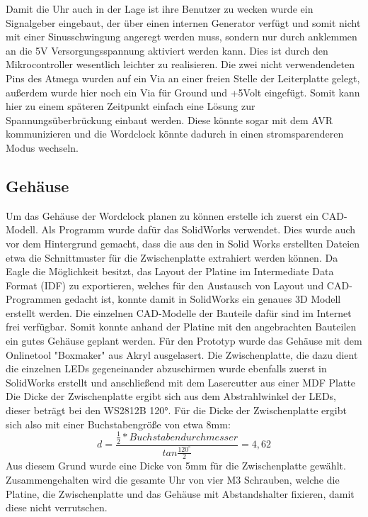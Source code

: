 \documentclass[12pt,journal,compsoc]{IEEEtran}
\begin{document}
Damit die Uhr auch in der Lage ist ihre Benutzer zu wecken wurde ein Signalgeber eingebaut, der über einen internen Generator verfügt und somit nicht mit einer Sinusschwingung angeregt werden muss, sondern nur durch anklemmen an die 5V Versorgungsspannung aktiviert werden kann. Dies ist durch den Mikrocontroller wesentlich leichter zu realisieren.
Die zwei nicht  verwendendeten Pins des Atmega wurden auf ein Via an einer freien Stelle der Leiterplatte gelegt, außerdem wurde hier noch ein Via für Ground und +5Volt eingefügt. Somit kann hier zu einem späteren Zeitpunkt einfach eine Lösung zur Spannungsüberbrückung einbaut werden. Diese könnte sogar mit dem AVR kommunizieren und die Wordclock könnte dadurch in einen stromsparenderen Modus wechseln.  

\subsection{Gehäuse}
Um das Gehäuse der Wordclock planen zu können erstelle ich zuerst ein CAD-Modell. Als Programm wurde dafür das SolidWorks verwendet. Dies wurde auch vor dem Hintergrund gemacht, dass die  aus den in Solid Works erstellten Dateien etwa die Schnittmuster für die Zwischenplatte extrahiert werden können. Da Eagle die Möglichkeit besitzt, das Layout der Platine im Intermediate Data Format  (IDF) zu exportieren, welches für den Austausch von Layout und CAD-Programmen gedacht ist, konnte damit in SolidWorks ein genaues 3D Modell erstellt werden. Die einzelnen CAD-Modelle der Bauteile dafür sind im Internet frei verfügbar. Somit konnte anhand der Platine mit den angebrachten Bauteilen ein gutes Gehäuse geplant werden. Für den Prototyp wurde das Gehäuse mit dem Onlinetool "Boxmaker" aus Akryl ausgelasert. Die Zwischenplatte, die dazu dient die einzelnen LEDs gegeneinander abzuschirmen wurde ebenfalls zuerst in SolidWorks erstellt und anschließend mit dem Lasercutter aus einer MDF Platte 
Die Dicke der Zwischenplatte ergibt sich aus dem Abstrahlwinkel der LEDs, dieser beträgt bei den WS2812B 120°. Für die Dicke der Zwischenplatte ergibt sich also mit einer Buchstabengröße von etwa 8mm: 
\begin{equation}
d = \frac{\frac{1}{2} * Buchstabendurchmesser}{tan\frac{120^\circ }{2}}= 4,62
\end{equation}
Aus diesem Grund wurde eine Dicke von 5mm für die Zwischenplatte gewählt.
Zusammengehalten wird die gesamte Uhr von vier M3 Schrauben, welche die Platine, die Zwischenplatte und das Gehäuse mit Abstandshalter fixieren, damit diese nicht verrutschen.
\end{document}
